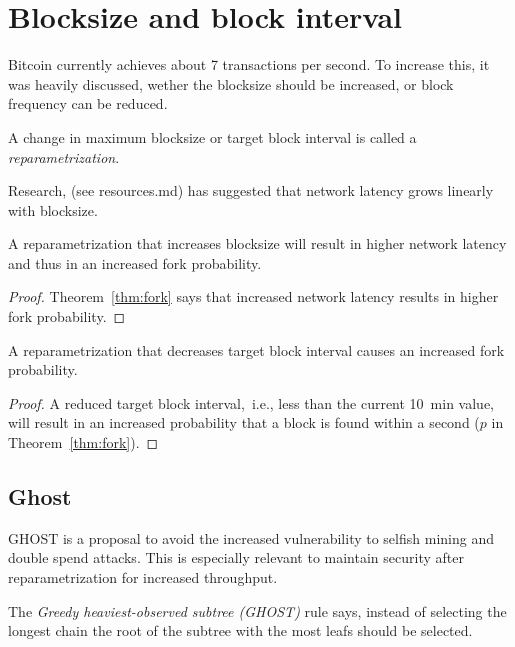 
\section{Blocksize and block interval}
Bitcoin currently achieves about 7 transactions per second. 
To increase this, it was heavily discussed, wether the blocksize should be increased, or block frequency can be reduced.

\begin{definition} A change in maximum blocksize or target block interval is called a \emph{reparametrization}.
\end{definition}

Research, (see resources.md) has suggested that network latency grows linearly with blocksize.
\begin{lem} 
	A reparametrization that increases blocksize will result in higher network latency and thus in an increased fork probability.
\end{lem}
\begin{proof}
Theorem~\ref{thm:fork} says that increased network latency results in higher fork probability.	
\end{proof}

\begin{lem}
	A reparametrization that decreases target block interval causes an increased fork probability.
\end{lem}
\begin{proof}
A reduced target block interval,~i.e., less than the current 10~min value, will result in an increased probability that a block is found within a second ($p$ in Theorem~\ref{thm:fork}).
\end{proof}

\subsection{Ghost}
GHOST is a proposal to avoid the increased vulnerability to selfish mining and double spend attacks. This is especially relevant to maintain security after reparametrization for increased throughput.

\begin{definition} The \emph{Greedy heaviest-observed subtree (GHOST)} rule says, instead of selecting the longest chain the root of the subtree with the most leafs should be selected.	
\end{definition}

